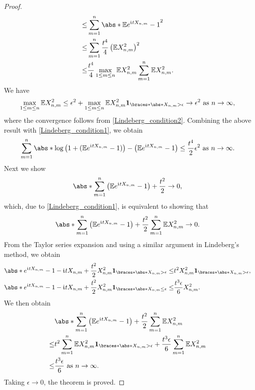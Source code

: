 \documentclass[12pt]{article}
\begin{document}
\begin{proof}
\begin{align*}
\leq& \sum_{m=1}^n \abs*{\E e^{\iu t X_{n,m}} - 1 }^2  \\
\leq& \sum_{m=1}^n \frac{t^4}{4} \left( \E X_{n,m}^2 \right)^2 \\
\leq& \frac{t^4}{4} \max_{1 \leq m \leq n} \E X_{n,m}^2 \sum_{m=1}^n \E X_{n,m}^2.
\end{align*}
We have
\begin{align*}
\max_{1 \leq m \leq n} \E X_{n,m}^2 
\leq \epsilon^2 + \max_{1 \leq m \leq n} \E X_{n,m}^2 \indicator{\abs*{X_{n,m}} > \epsilon}
\to \epsilon^2 \ \text{as}\ n \to \infty,
\end{align*}
where the convergence follows from \cref{Lindeberg_condition2}. Combining the above result with \cref{Lindeberg_condition1}, we obtain
\begin{align}
\sum_{m=1}^n \abs*{\log \left(1+(\E e^{\iu t X_{n,m}} - 1)\right) - \left( \E e^{\iu t X_{n,m}} - 1 \right)}
\leq 
\frac{t^4}{2}\epsilon^2 \ \text{as}\ n \to \infty. \label{Lindeberg_intmd_ineq4}
\end{align}
Next we show
\begin{align*}
\abs*{\sum_{m=1}^n \left(\E e^{\iu t X_{n,m}} - 1 \right) + \frac{t^2}{2}} \to 0,
\end{align*}
which, due to \cref{Lindeberg_condition1}, is equivalent to showing that
\begin{align*}
\abs*{\sum_{m=1}^n \left(\E e^{\iu t X_{n,m}} - 1 \right) + \frac{t^2}{2} \sum_{m=1}^n \E X_{n,m}^2} \to 0.
\end{align*}
From the Taylor series expansion and using a similar argument in Lindeberg's method, we obtain
\begin{align*}
\abs*{ e^{\iu t X_{n,m}} - 1 - \iu t X_{n,m} + \frac{t^2}{2} X_{n,m}^2} \indicator{\abs*{X_{n,m}} > \epsilon}
\leq& t^2 X_{n,m}^2 \indicator{\abs*{X_{n,m}} > \epsilon}, \\
%
\abs*{ e^{\iu t X_{n,m}} - 1 - \iu t X_{n,m} + \frac{t^2}{2} X_{n,m}^2} \indicator{\abs*{X_{n,m}} \leq \epsilon}
\leq& \frac{t^3 \epsilon}{6} X_{n,m}^2.
\end{align*}
We then obtain
\begin{align*}
&\abs*{\sum_{m=1}^n \left( \E e^{\iu t X_{n,m}} - 1 \right) + \frac{t^2}{2} \sum_{m=1}^n \E X_{n,m}^2} \\
\leq& t^2 \sum_{m=1}^n \E X_{n,m}^2 \indicator{\abs*{X_{n,m}} > \epsilon} + \frac{t^3 \epsilon}{6} \sum_{m=1}^n \E X_{n,m}^2 \\
\leq& \frac{t^3 \epsilon}{6} \ \text{as}\ n \to \infty.
\end{align*}
Taking $\epsilon \to 0$, the theorem is proved.
\end{proof}
\end{document}
